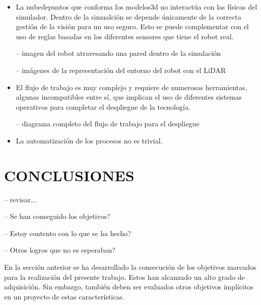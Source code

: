 \documentclass[a4paper, 12pt, spanish, twoside]{article}
\begin{document}
\begin{itemize} 

\item La \gls{nubedepuntos} que conforma los \gls{modelos3d} no interactúa con las físicas del simulador. Dentro de la simualción se depende únicamente de la correcta gestión de la visión para un uso seguro. Esto se puede complementar con el uso de reglas basadas en los diferentes sensores que tiene el robot real.  

-- imagen del robot atravesando una pared dentro de la simulación  

-- imágenes de la representación del entorno del robot con el LiDAR 

\item El flujo de trabajo es muy complejo y requiere de numerosas herramientas, algunas incompatibles entre sí, que implican el uso de diferentes sistemas operativos para completar el despliegue de la tecnología. 

-- diagrama completo del flujo de trabajo para el despliegue 

\item La automatización de los procesos no es trivial. 

\end{itemize} 

\clearpage





\newpage
\section{CONCLUSIONES} \label{sec:conclusiones}

-- revisar...

-- Se han conseguido los objetivos?  

-- Estoy contento con lo que se ha hecho? 

-- Otros logros que no es esperaban? 

En la sección anterior se ha desarrollado la consecución de los objetivos marcados para la realización del presente trabajo. Estos han alcanzado un alto grado de adquisición. Sin embargo, también deben ser evaluados otros objetivos implícitos en un proyecto de estas características. 
\end{document}
